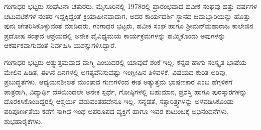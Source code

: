 {ಗಂಗಾಧರ ಭಟ್ಟರು ಸಂಘಟನಾ ಚತುರರು.  ಮೈಸೂರಿನಲ್ಲಿ 1978ರಲ್ಲಿ ಪ್ರಾರಂಭ\-ವಾದ ಹವೀಕ ಸಂಘವು ಹತ್ತು ವರ್ಷಗಳ ಚಟುವಟಿಕೆಗಳ ನಂತರ ಇದ್ದಕ್ಕಿದ್ದಂತೆ ಕ್ರಿಯಾಹೀನವಾದಾಗ, ಅದರ ಕಾರ್ಯದರ್ಶಿ ಸ್ಥಾನದ ಜವಾಬ್ದಾರಿಯನ್ನು ಹೊತ್ತು ಪುನಃ ಚೇತರಿಸಿ\-ಕೊಳ್ಳುವಂತೆ ಮಾಡಿದರು.  ಗಂಗಾಧರ ಭಟ್ಟರು, ಹವೀಕ ಸಂಘ ಹಾಗೂ  ಶ್ರೀಮನ್‍\-ಮಹಾರಾಜ ಕಾಲೇಜಿನ ಪ್ರದೋಷ ಸಂಘದ ಆಶ್ರಯದಲ್ಲಿ ಅನೇಕ ವೈವಿಧ್ಯಮಯ ಕಾರ್ಯಕ್ರಮಗಳನ್ನು ಹಮ್ಮಿಕೊಂಡು ಅವುಗಳನ್ನು ಆಕರ್ಷಕವಾಗುವಂತೆ ನಿರ್ವಹಿಸಿ ಯಶಸ್ಸುಗಳಿಸಿದ್ದಾರೆ.  

ಗಂಗಾಧರ ಭಟ್ಟರು ಅತ್ಯುತ್ತಮವಾದ ವಾಗ್ಮಿ ಎಂಬುದರಲ್ಲಿ ಯಾವುದೆ ಶಂಕೆ ಇಲ್ಲ.  ಕನ್ನಡ ಹಾಗು ಸಂಸ್ಕೃತ ಭಾಷೆಯ ಮೇಲಿನ ಹಿಡಿತ, ಈಗಿನ ದಿನಗಳಲ್ಲಿ ಅಗತ್ಯ\-ವೆನಿಸು\-ವಷ್ಟು ಇಂಗ್ಲೀಷಿನ ತಿಳಿವಳಿಕೆ, ವಿಷಯದ ಕುರಿತ ಅರಿವು, ಪ್ರಬುದ್ಧತೆಗಳು,  ಆಧ್ಯಯನ\-ಶೀಲತೆ ಮುಂತಾದ ಗುಣಗಳಿಂದ ಈತ ಅತ್ಯುತ್ತಮ ಭಾಷಣಕಾರ ಎಂಬ ಹೆಗ್ಗಳಿಕೆಗೆ ಪಾತ್ರರಾಗಿ, ವಿದ್ಯಾರ್ಥಿ ದೆಸೆಯಿಂದಲೇ ಅನೇಕ ಸ್ಪರ್ಧೆ, ಗೋಷ್ಠಿಗಳಲ್ಲಿ ಬಹುಮಾನ, ಪ್ರಶಸ್ತಿ ಹಾಗೂ ಪುರಸ್ಕಾರಗಳನ್ನು ದೊರಕಿಸಿಕೊಂಡಿದ್ದರಲ್ಲಿ ಆಶ್ಚರ್ಯ ಪಡುವಂತಹದೇನೂ ಇಲ್ಲ.  ಸನ್ನಡತೆ, ಸತ್\enginline{-}ಚಾರಿತ್ರ್ಯಗಳನ್ನು ಅಳವಡಿಸಿಕೊಂಡು ಪರಿಪೂರ್ಣತೆಯ ಕಡೆಗೆ ಸಾಗಿದ ಇಂಥ ಅಪರೂಪದ ವ್ಯಕ್ತಿಗೆ ಹಾಗೂ ಇವರ ಕುಟುಂಬಕ್ಕೆ ಅಭಿನಂದನೆಗಳು, ಶುಭಹಾರೈಕೆಗಳು.   

\articleend
}

